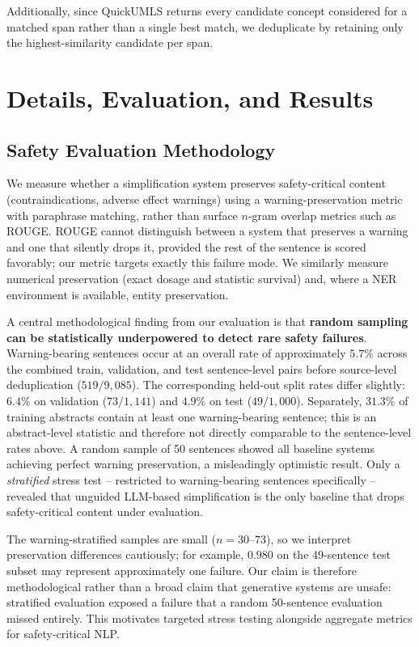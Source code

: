 \documentclass[11pt]{article}
\begin{document}
Additionally, since QuickUMLS returns every candidate concept considered for a
matched span rather than a single best match, we deduplicate by retaining only
the highest-similarity candidate per span.

\section{Details, Evaluation, and Results}
\label{sec:results}

\subsection{Safety Evaluation Methodology}
\label{sec:safety-eval}

We measure whether a simplification system preserves safety-critical content
(contraindications, adverse effect warnings) using a warning-preservation metric
with paraphrase matching, rather than surface $n$-gram overlap metrics such as
ROUGE. ROUGE cannot distinguish between a system that preserves a warning and one
that silently drops it, provided the rest of the sentence is scored favorably;
our metric targets exactly this failure mode. We similarly measure numerical
preservation (exact dosage and statistic survival) and, where a NER environment is
available, entity preservation.

A central methodological finding from our evaluation is that \textbf{random
sampling can be statistically underpowered to detect rare safety failures}.
Warning-bearing sentences occur at an overall rate of approximately $5.7\%$
across the combined train, validation, and test sentence-level pairs before
source-level deduplication ($519/9{,}085$). The corresponding held-out split
rates differ slightly: $6.4\%$ on validation ($73/1{,}141$) and $4.9\%$ on
test ($49/1{,}000$). Separately, $31.3\%$ of training abstracts contain at
least one warning-bearing sentence; this is an abstract-level statistic and
therefore not directly comparable to the sentence-level rates above. A random
sample of 50 sentences showed all baseline
systems achieving perfect warning preservation, a misleadingly optimistic result.
Only a \emph{stratified} stress test -- restricted to warning-bearing sentences
specifically -- revealed that unguided LLM-based simplification is the only
baseline that drops safety-critical content under evaluation.

The warning-stratified samples are small ($n=30$--$73$), so we interpret
preservation differences cautiously; for example, $0.980$ on the
49-sentence test subset may represent approximately one failure. Our claim
is therefore methodological rather than a broad claim that generative
systems are unsafe: stratified evaluation exposed a failure that a random
50-sentence evaluation missed entirely. This motivates targeted stress
testing alongside aggregate metrics for safety-critical NLP.
\end{document}
